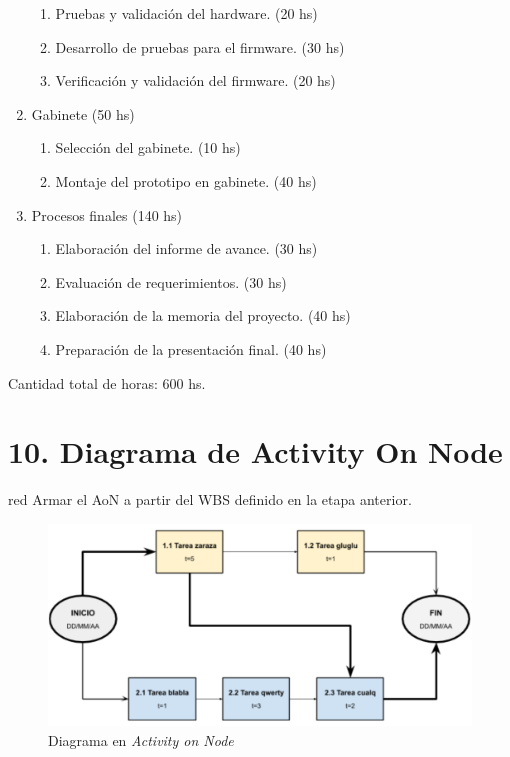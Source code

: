 \documentclass[
11pt, %
codirector, %
]{charter}
\begin{document}
\begin{enumerate}
\begin{enumerate}
	\item Pruebas y validación del hardware. (20 hs)
	\item Desarrollo de pruebas para el firmware. (30 hs)
	\item Verificación y validación del firmware. (20 hs)
	\end{enumerate}
\item Gabinete (50 hs)
	\begin{enumerate}
	\item Selección del gabinete. (10 hs)
	\item Montaje del prototipo en gabinete. (40 hs)
	\end{enumerate}
\item Procesos finales (140 hs)
	\begin{enumerate}
	\item Elaboración del informe de avance. (30 hs)
	\item Evaluación de requerimientos. (30 hs)
	\item Elaboración de la memoria del proyecto. (40 hs)
	\item Preparación de la presentación final. (40 hs)
	\end{enumerate}
\end{enumerate}


Cantidad total de horas: 600 hs.

\section{10. Diagrama de Activity On Node}
\label{sec:AoN}

\begin{consigna}{red}
Armar el AoN a partir del WBS definido en la etapa anterior. 



\end{consigna}

\begin{figure}[htpb]
\centering 
\includegraphics[width=.8\textwidth]{./Figuras/AoN.png}
\caption{Diagrama en \textit{Activity on Node}}
\label{fig:AoN}
\end{figure}
\end{document}
